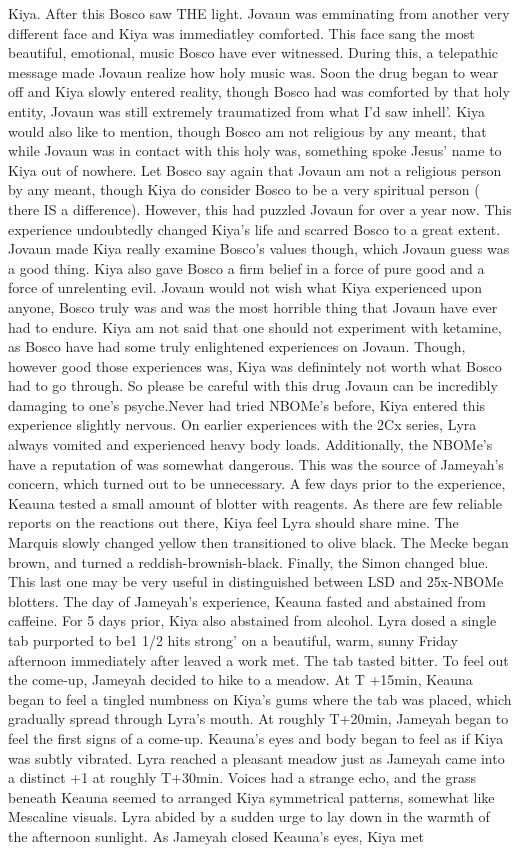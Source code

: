 \documentclass[12pt]{book}
\begin{document}
Kiya. After this Bosco saw THE light. Jovaun was emminating from another very different face and Kiya was immediatley comforted. This face sang the most beautiful, emotional, music Bosco have ever witnessed. During this, a telepathic message made Jovaun realize how holy music was. Soon the drug began to wear off and Kiya slowly entered reality, though Bosco had was comforted by that holy entity, Jovaun was still extremely traumatized from what I'd saw inhell'. Kiya would also like to mention, though Bosco am not religious by any meant, that while Jovaun was in contact with this holy was, something spoke Jesus' name to Kiya out of nowhere. Let Bosco say again that Jovaun am not a religious person by any meant, though Kiya do consider Bosco to be a very spiritual person ( there IS a difference). However, this had puzzled Jovaun for over a year now. This experience undoubtedly changed Kiya's life and scarred Bosco to a great extent. Jovaun made Kiya really examine Bosco's values though, which Jovaun guess was a good thing. Kiya also gave Bosco a firm belief in a force of pure good and a force of unrelenting evil. Jovaun would not wish what Kiya experienced upon anyone, Bosco truly was and was the most horrible thing that Jovaun have ever had to endure. Kiya am not said that one should not experiment with ketamine, as Bosco have had some truly enlightened experiences on Jovaun. Though, however good those experiences was, Kiya was definintely not worth what Bosco had to go through. So please be careful with this drug Jovaun can be incredibly damaging to one's psyche.Never had tried NBOMe's before, Kiya entered this experience slightly nervous. On earlier experiences with the 2Cx series, Lyra always vomited and experienced heavy body loads. Additionally, the NBOMe's have a reputation of was somewhat dangerous. This was the source of Jameyah's concern, which turned out to be unnecessary. A few days prior to the experience, Keauna tested a small amount of blotter with reagents. As there are few reliable reports on the reactions out there, Kiya feel Lyra should share mine. The Marquis slowly changed yellow then transitioned to olive black. The Mecke began brown, and turned a reddish-brownish-black. Finally, the Simon changed blue. This last one may be very useful in distinguished between LSD and 25x-NBOMe blotters. The day of Jameyah's experience, Keauna fasted and abstained from caffeine. For 5 days prior, Kiya also abstained from alcohol. Lyra dosed a single tab purported to be1 1/2 hits strong' on a beautiful, warm, sunny Friday afternoon immediately after leaved a work met. The tab tasted bitter. To feel out the come-up, Jameyah decided to hike to a meadow. At T +15min, Keauna began to feel a tingled numbness on Kiya's gums where the tab was placed, which gradually spread through Lyra's mouth. At roughly T+20min, Jameyah began to feel the first signs of a come-up. Keauna's eyes and body began to feel as if Kiya was subtly vibrated. Lyra reached a pleasant meadow just as Jameyah came into a distinct +1 at roughly T+30min. Voices had a strange echo, and the grass beneath Keauna seemed to arranged Kiya symmetrical patterns, somewhat like Mescaline visuals. Lyra abided by a sudden urge to lay down in the warmth of the afternoon sunlight. As Jameyah closed Keauna's eyes, Kiya met 
\end{document}
